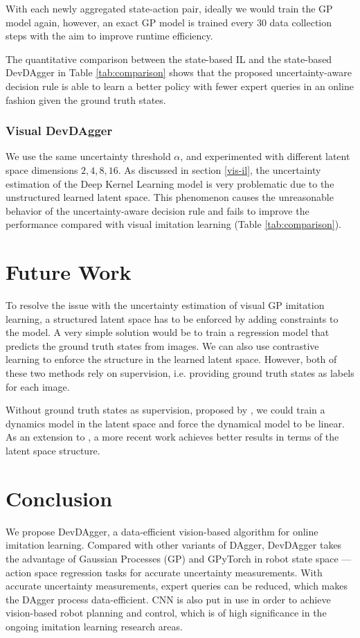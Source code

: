 \documentclass[11pt, reqno, letterpaper, twoside]{amsart}
\begin{document}
With each newly aggregated state-action pair, ideally we would train the GP model again, however, an exact GP model is trained every $30$ data collection steps with the aim to improve runtime efficiency.

The quantitative comparison between the state-based IL and the state-based DevDAgger in Table \ref{tab:comparison} shows that the proposed uncertainty-aware decision rule is able to learn a better policy with fewer expert queries in an online fashion given the ground truth states.

\subsubsection{Visual DevDAgger}
We use the same uncertainty threshold $\alpha$, and experimented with different latent space dimensions $2, 4, 8, 16$.
As discussed in section \ref{vis-il}, the uncertainty estimation of the Deep Kernel Learning model is very problematic due to the unstructured learned latent space. This phenomenon causes the unreasonable behavior of the uncertainty-aware decision rule and fails to improve the performance compared with visual imitation learning (Table \ref{tab:comparison}).

\section{Future Work}
To resolve the issue with the uncertainty estimation of visual GP imitation learning, a structured latent space has to be enforced by adding constraints to the model. A very simple solution would be to train a regression model that predicts the ground truth states from images. We can also use contrastive learning to enforce the structure in the learned latent space. However, both of these two methods rely on supervision, i.e. providing ground truth states as labels for each image.

Without ground truth states as supervision, proposed by \cite{watter2015embed}, we could train a dynamics model in the latent space and force the dynamical model to be linear. As an extension to \cite{watter2015embed}, a more recent work \cite{levine2019prediction} achieves better results in terms of the latent space structure.

\section{Conclusion}
We propose DevDAgger, a data-efficient vision-based algorithm for online imitation learning. Compared with other variants of DAgger, DevDAgger takes the advantage of Gaussian Processes (GP) and GPyTorch \cite{GPyTorch} in robot state space --- action space regression tasks for accurate uncertainty measurements. With accurate uncertainty measurements, expert queries can be reduced, which makes the DAgger process data-efficient. CNN is also put in use in order to achieve vision-based robot planning and control, which is of high significance in the ongoing imitation learning research areas.
\end{document}
